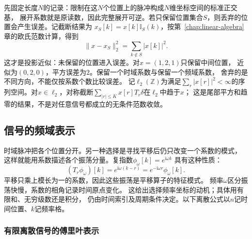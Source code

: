 先固定长度$N$的记录：限制在这$N$个位置上的脉冲构成$N$维坐标空间的标准正交基，
展开系数就是原读数，因此完整展开可逆。若只保留位置集合$S$，则丢弃的位置会产生误差。记截断结果为
$x_S[k]=x[k]\mathbb I_S(k)$，按第~\ref{chap:linear-algebra}章的欧氏范数计算，得到
\[
  \|x-x_S\|_2^2=\sum_{k\notin S}|x[k]|^2.
\]
这才是投影近似：未保留的位置进入误差。对$x=(1,2,1)$只保留中间位置，
近似为$(0,2,0)$，平方误差为$2$。保留一个时域系数与保留一个频域系数，
舍弃的是不同方向，不能仅按系数个数比较误差。
记$\ell_2(\mathbb Z)$为满足$\sum_r|x[r]|^2<\infty$的序列空间。对$x\in\ell_2$，对称截断$\sum_{|r|\leq K}x[r]T_r\delta$在$\ell_2$中趋于$x$；
这是尾部平方和趋零的结果，不是对任意信号都成立的无条件范数收敛。

\subsection{信号的频域表示}
\label{sec:signal-analysis-frequency-representation}

时域脉冲把各个位置分开。另一种选择是寻找平移后仍只改变一个系数的模式，
这样就能用系数描述各个振荡分量。复指数$\phi_\omega[k]=e^{\mathrm i\omega k}$
具有这种性质：
\[
  (T_r\phi_\omega)[k]
  =e^{\mathrm i\omega(k-r)}
  =e^{-\mathrm i\omega r}\phi_\omega[k].
\]
平移只乘上模长为一的系数，因此这些振荡是平移算子的特征模式。
频率$\omega$区分振荡快慢，系数的相角记录时间原点变化。
这给出选择频率坐标的动机；具体用有限和、无穷级数还是积分，
仍由时间索引及周期条件决定。以下离散公式以$n$记时间位置、$k$记频率格。

\subsubsection{有限离散信号的傅里叶表示}

